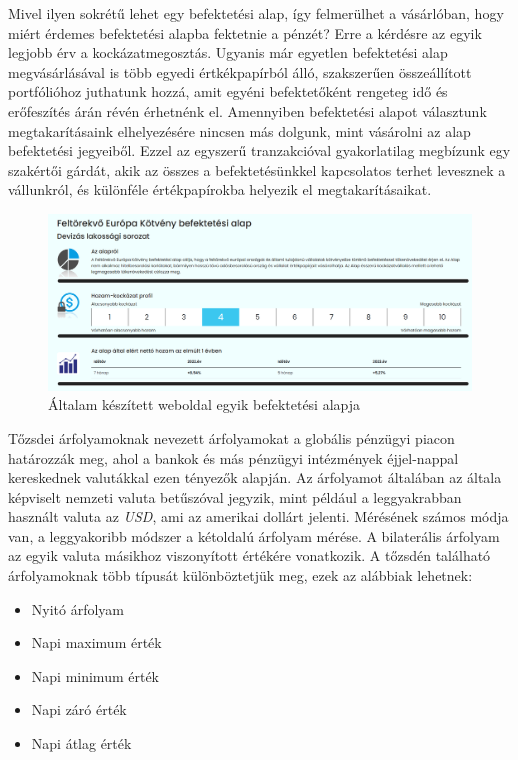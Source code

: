 	Mivel ilyen sokrétű lehet egy befektetési alap, így felmerülhet a vásárlóban, hogy miért érdemes befektetési alapba fektetnie a pénzét? Erre a kérdésre az egyik legjobb érv a kockázatmegosztás. Ugyanis már egyetlen befektetési alap megvásárlásával is több egyedi értkékpapírból álló, szakszerűen összeállított portfólióhoz juthatunk hozzá, amit egyéni befektetőként rengeteg idő és erőfeszítés árán révén érhetnénk el. Amennyiben befektetési alapot választunk megtakarításaink elhelyezésére nincsen más dolgunk, mint vásárolni az alap befektetési jegyeiből. Ezzel az egyszerű tranzakcióval gyakorlatilag megbízunk egy szakértői gárdát, akik az összes a befektetésünkkel kapcsolatos terhet levesznek a vállunkról, és különféle értékpapírokba helyezik el megtakarításaikat.

\begin{figure}[h]
\centering
\includegraphics[scale=0.3]{images/europeInvestExample}
\caption{Általam készített weboldal egyik befektetési alapja}
\end{figure}


Tőzsdei árfolyamoknak nevezett árfolyamokat a globális pénzügyi piacon határozzák meg, ahol a bankok és más pénzügyi intézmények éjjel-nappal kereskednek valutákkal ezen tényezők alapján. Az árfolyamot általában az általa képviselt nemzeti valuta betűszóval jegyzik, mint például a leggyakrabban használt valuta az \emph{USD}, ami az amerikai dollárt jelenti. Mérésének számos módja van, a  leggyakoribb módszer a kétoldalú árfolyam mérése. A bilaterális árfolyam az egyik valuta másikhoz viszonyított értékére vonatkozik. A tőzsdén található árfolyamoknak több típusát különböztetjük meg, ezek az alábbiak lehetnek: 
\begin{itemize}
\item Nyitó árfolyam
\item Napi maximum érték
\item Napi minimum érték
\item Napi záró érték
\item Napi átlag érték
\end{itemize}

